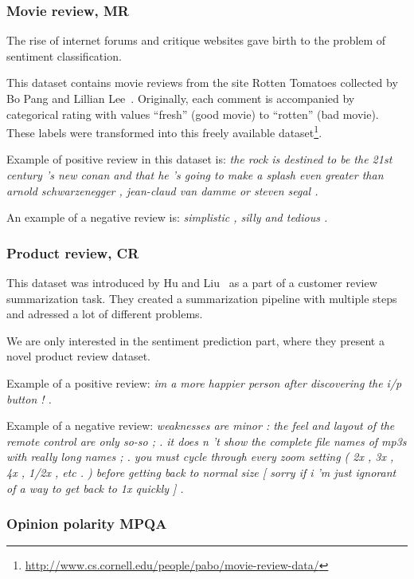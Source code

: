     \subsubsection{Movie review, MR}
    
    The rise of internet forums and critique websites gave birth to the problem of sentiment classification.
    
    This dataset contains movie reviews from the site Rotten Tomatoes collected by Bo Pang and Lillian Lee~\cite{pang2002thumbs}.
    Originally, each comment is accompanied by categorical rating with values ``fresh'' (good movie) to ``rotten'' (bad movie). 
    These labels were transformed into this freely available dataset\footnote{\url{http://www.cs.cornell.edu/people/pabo/movie-review-data/}}.
    
    Example of positive review in this dataset is: \emph{the rock is destined to be the 21st century 's new conan and that he 's going to make a splash even greater than arnold schwarzenegger , jean-claud van damme or steven segal .}

    An example of a negative review is: \emph{simplistic , silly and tedious .}
    
    \subsubsection{Product review, CR}
    
    This dataset was introduced by Hu and Liu~\cite{hu2004mining} as a part of a customer review summarization task. 
    They created a summarization pipeline with multiple steps and adressed a lot of different problems. 
    
    We are only interested in the sentiment prediction part, where they present a novel product review dataset.
    
    Example of a positive review:
    \emph{im a more happier person after discovering the i/p button ! .}

    Example of a negative review:
    \emph{weaknesses are minor : the feel and layout of the remote control are only so-so ; . it does n 't show the complete file names of mp3s with really long names ; . you must cycle through every zoom setting ( 2x , 3x , 4x , 1/2x , etc . ) before getting back to normal size [ sorry if i 'm just ignorant of a way to get back to 1x quickly ] .}

    \subsubsection{Opinion polarity MPQA}

